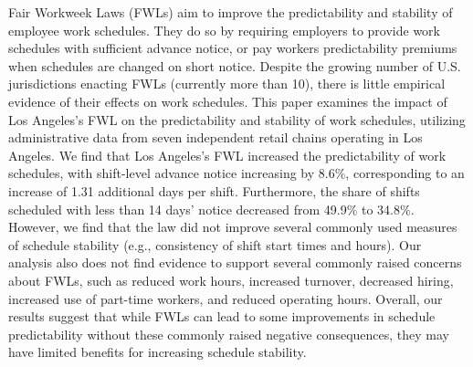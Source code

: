 \documentclass[letterpaper,11pt,leqno]{article}
\theoremstyle{paper}
\begin{document}
\begin{titlepage}\maketitle


\noindent
\begin{singlespace}
Fair Workweek Laws (FWLs) aim to improve the predictability and stability of employee work schedules. They do so by requiring employers to provide work schedules with sufficient advance notice, or pay workers predictability premiums when schedules are changed on short notice. Despite the growing number of U.S. jurisdictions enacting FWLs (currently more than 10), there is little empirical evidence of their effects on work schedules. This paper examines the impact of Los Angeles's FWL on the predictability and stability of work schedules, utilizing administrative data from seven independent retail chains operating in Los Angeles. We find that Los Angeles's FWL increased the predictability of work schedules, with shift-level advance notice increasing by 8.6\%, corresponding to an increase of 1.31 additional days per shift.
Furthermore, the share of shifts scheduled with less than 14 days' notice decreased from 49.9\% to 34.8\%. However, we find that the law did not improve several commonly used measures of schedule stability (e.g., consistency of shift start times and hours). Our analysis also does not find evidence to support several commonly raised concerns about FWLs, such as reduced work hours, increased turnover, decreased hiring, increased use of part-time workers, and reduced operating hours. Overall, our results suggest that while FWLs can lead to some improvements in schedule predictability without these commonly raised negative consequences, they may have limited benefits for increasing schedule stability.



    
\end{singlespace}




\end{titlepage}
\end{document}
